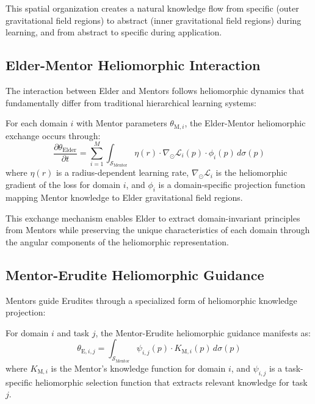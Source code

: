 This spatial organization creates a natural knowledge flow from specific (outer gravitational field regions) to abstract (inner gravitational field regions) during learning, and from abstract to specific during application.

\subsection{Elder-Mentor Heliomorphic Interaction}

The interaction between Elder and Mentors follows heliomorphic dynamics that fundamentally differ from traditional hierarchical learning systems:

\begin{proposition}
For each domain $i$ with Mentor parameters $\theta_{\text{M},i}$, the Elder-Mentor heliomorphic exchange occurs through:
\begin{equation}
\frac{\partial \theta_{\text{Elder}}}{\partial t} = \sum_{i=1}^M \int_{\mathcal{S}_{\text{Mentor}}} \eta(r) \cdot \nabla_{\odot} \mathcal{L}_i(p) \cdot \phi_i(p) \, d\sigma(p)
\end{equation}
where $\eta(r)$ is a radius-dependent learning rate, $\nabla_{\odot} \mathcal{L}_i$ is the heliomorphic gradient of the loss for domain $i$, and $\phi_i$ is a domain-specific projection function mapping Mentor knowledge to Elder gravitational field regions.
\end{proposition}

This exchange mechanism enables Elder to extract domain-invariant principles from Mentors while preserving the unique characteristics of each domain through the angular components of the heliomorphic representation.

\subsection{Mentor-Erudite Heliomorphic Guidance}

Mentors guide Erudites through a specialized form of heliomorphic knowledge projection:

\begin{proposition}
For domain $i$ and task $j$, the Mentor-Erudite heliomorphic guidance manifests as:
\begin{equation}
\theta_{\text{E},i,j} = \int_{\mathcal{S}_{\text{Mentor}}} \psi_{i,j}(p) \cdot K_{\text{M},i}(p) \, d\sigma(p)
\end{equation}
where $K_{\text{M},i}$ is the Mentor's knowledge function for domain $i$, and $\psi_{i,j}$ is a task-specific heliomorphic selection function that extracts relevant knowledge for task $j$.
\end{proposition}

